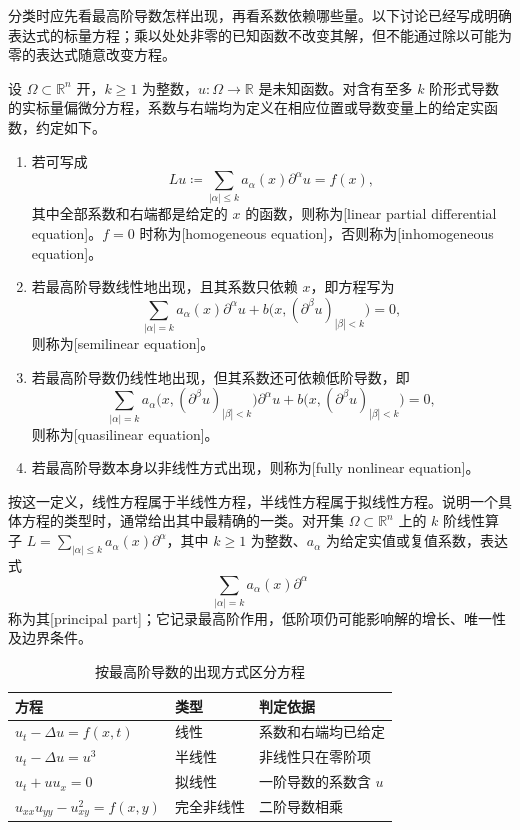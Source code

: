 分类时应先看最高阶导数怎样出现，再看系数依赖哪些量。以下讨论已经写成明确表达式的标量方程；乘以处处非零的已知函数不改变其解，但不能通过除以可能为零的表达式随意改变方程。

\begin{definition}\label{b2:def:01-pde-linearity}
设 \(\Omega\subset\mathbb R^n\) 开，\(k\ge1\) 为整数，\(u:\Omega\to\mathbb R\) 是未知函数。对含有至多 \(k\) 阶形式导数的实标量偏微分方程，系数与右端均为定义在相应位置或导数变量上的给定实函数，约定如下。
\begin{enumerate}
\item\label{b2:item:01-pde-linear}若可写成
\[
Lu\coloneqq\sum_{|\alpha|\leq k}a_\alpha(x)\partial^\alpha u=f(x),
\]
其中全部系数和右端都是给定的 \(x\) 的函数，则称为[linear partial differential equation]。\(f=0\) 时称为[homogeneous equation]，否则称为[inhomogeneous equation]。
\item\label{b2:item:01-pde-semilinear}若最高阶导数线性地出现，且其系数只依赖 \(x\)，即方程写为
\[
\sum_{|\alpha|=k}a_\alpha(x)\partial^\alpha u
+b\bigl(x,(\partial^\beta u)_{|\beta|<k}\bigr)=0,
\]
则称为[semilinear equation]。
\item\label{b2:item:01-pde-quasilinear}若最高阶导数仍线性地出现，但其系数还可依赖低阶导数，即
\[
\sum_{|\alpha|=k}a_\alpha\bigl(x,(\partial^\beta u)_{|\beta|<k}\bigr)\partial^\alpha u
+b\bigl(x,(\partial^\beta u)_{|\beta|<k}\bigr)=0,
\]
则称为[quasilinear equation]。
\item\label{b2:item:01-pde-fullynonlinear}若最高阶导数本身以非线性方式出现，则称为[fully nonlinear equation]。
\end{enumerate}
\end{definition}

按这一定义，线性方程属于半线性方程，半线性方程属于拟线性方程。说明一个具体方程的类型时，通常给出其中最精确的一类。对开集 \(\Omega\subset\mathbb R^n\) 上的 \(k\) 阶线性算子 \(L=\sum_{|\alpha|\le k}a_\alpha(x)\partial^\alpha\)，其中 \(k\ge1\) 为整数、\(a_\alpha\) 为给定实值或复值系数，表达式
\[
\sum_{|\alpha|=k}a_\alpha(x)\partial^\alpha
\]
称为其[principal part]；它记录最高阶作用，低阶项仍可能影响解的增长、唯一性及边界条件。

\begin{table}[htbp]
\centering
\caption{按最高阶导数的出现方式区分方程}
\label{b2:tab:01-pde-types}
\begin{tabular}{lll}
\toprule
方程 & 类型 & 判定依据 \\
\midrule
\(u_t-\Delta u=f(x,t)\) & 线性 & 系数和右端均已给定 \\
\(u_t-\Delta u=u^3\) & 半线性 & 非线性只在零阶项 \\
\(u_t+u u_x=0\) & 拟线性 & 一阶导数的系数含 \(u\) \\
\(u_{xx}u_{yy}-u_{xy}^2=f(x,y)\) & 完全非线性 & 二阶导数相乘 \\
\bottomrule
\end{tabular}
\end{table}

